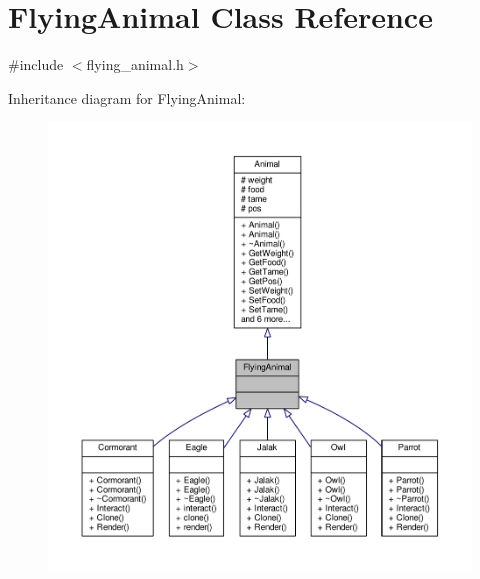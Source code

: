 \hypertarget{classFlyingAnimal}{}\section{Flying\+Animal Class Reference}
\label{classFlyingAnimal}


{\ttfamily \#include $<$flying\+\_\+animal.\+h$>$}



Inheritance diagram for Flying\+Animal\+:
\nopagebreak
\begin{figure}[H]
\begin{center}
\leavevmode
\includegraphics[width=350pt]{classFlyingAnimal__inherit__graph}
\end{center}
\end{figure}


